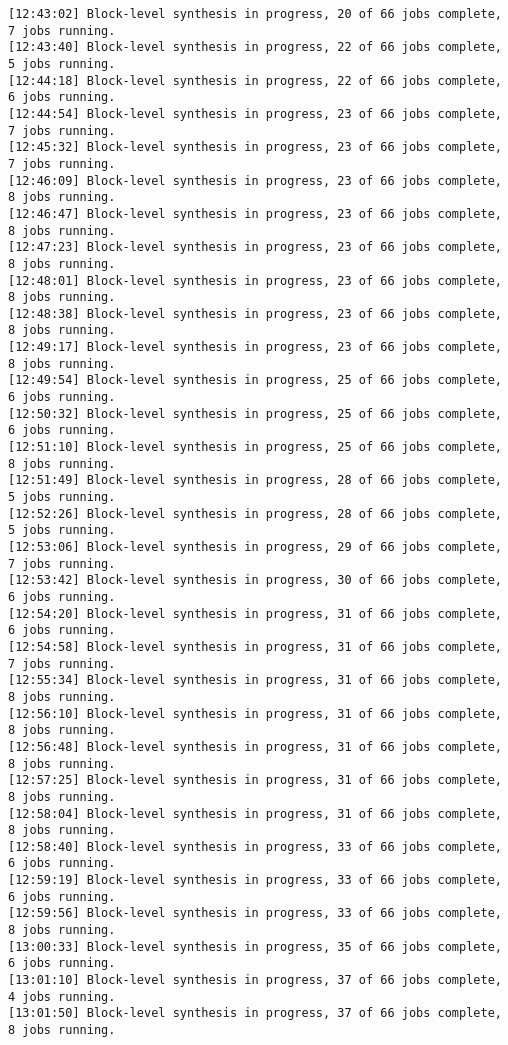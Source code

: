 \begin{lstlisting}[label=lst:lev_rec,caption=Содержимое log-файла]
[12:43:02] Block-level synthesis in progress, 20 of 66 jobs complete, 7 jobs running.
[12:43:40] Block-level synthesis in progress, 22 of 66 jobs complete, 5 jobs running.
[12:44:18] Block-level synthesis in progress, 22 of 66 jobs complete, 6 jobs running.
[12:44:54] Block-level synthesis in progress, 23 of 66 jobs complete, 7 jobs running.
[12:45:32] Block-level synthesis in progress, 23 of 66 jobs complete, 7 jobs running.
[12:46:09] Block-level synthesis in progress, 23 of 66 jobs complete, 8 jobs running.
[12:46:47] Block-level synthesis in progress, 23 of 66 jobs complete, 8 jobs running.
[12:47:23] Block-level synthesis in progress, 23 of 66 jobs complete, 8 jobs running.
[12:48:01] Block-level synthesis in progress, 23 of 66 jobs complete, 8 jobs running.
[12:48:38] Block-level synthesis in progress, 23 of 66 jobs complete, 8 jobs running.
[12:49:17] Block-level synthesis in progress, 23 of 66 jobs complete, 8 jobs running.
[12:49:54] Block-level synthesis in progress, 25 of 66 jobs complete, 6 jobs running.
[12:50:32] Block-level synthesis in progress, 25 of 66 jobs complete, 6 jobs running.
[12:51:10] Block-level synthesis in progress, 25 of 66 jobs complete, 8 jobs running.
[12:51:49] Block-level synthesis in progress, 28 of 66 jobs complete, 5 jobs running.
[12:52:26] Block-level synthesis in progress, 28 of 66 jobs complete, 5 jobs running.
[12:53:06] Block-level synthesis in progress, 29 of 66 jobs complete, 7 jobs running.
[12:53:42] Block-level synthesis in progress, 30 of 66 jobs complete, 6 jobs running.
[12:54:20] Block-level synthesis in progress, 31 of 66 jobs complete, 6 jobs running.
[12:54:58] Block-level synthesis in progress, 31 of 66 jobs complete, 7 jobs running.
[12:55:34] Block-level synthesis in progress, 31 of 66 jobs complete, 8 jobs running.
[12:56:10] Block-level synthesis in progress, 31 of 66 jobs complete, 8 jobs running.
[12:56:48] Block-level synthesis in progress, 31 of 66 jobs complete, 8 jobs running.
[12:57:25] Block-level synthesis in progress, 31 of 66 jobs complete, 8 jobs running.
[12:58:04] Block-level synthesis in progress, 31 of 66 jobs complete, 8 jobs running.
[12:58:40] Block-level synthesis in progress, 33 of 66 jobs complete, 6 jobs running.
[12:59:19] Block-level synthesis in progress, 33 of 66 jobs complete, 6 jobs running.
[12:59:56] Block-level synthesis in progress, 33 of 66 jobs complete, 8 jobs running.
[13:00:33] Block-level synthesis in progress, 35 of 66 jobs complete, 6 jobs running.
[13:01:10] Block-level synthesis in progress, 37 of 66 jobs complete, 4 jobs running.
[13:01:50] Block-level synthesis in progress, 37 of 66 jobs complete, 8 jobs running.

\end{lstlisting}
